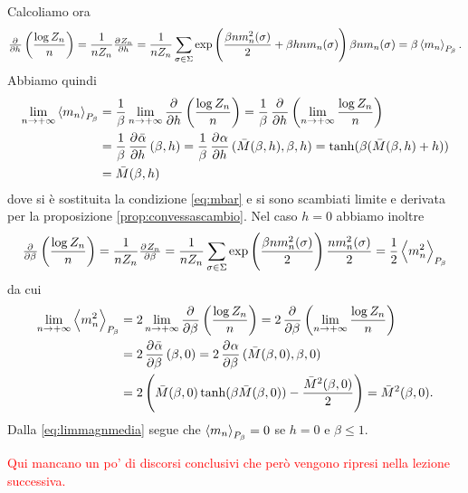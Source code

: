Calcoliamo ora
\[ \pd{}{h}\left(\frac{\log Z_n}{n}\right) = \frac{1}{n Z_n} \pd{Z_n}{h} = \frac{1}{nZ_n}\sum_{\sigma \in \Sigma} \exp\left( \frac{\beta n m_n^2(\sigma)}{2} + \beta h n m_n(\sigma) \right) \beta n m_n(\sigma) = \beta \mean{m_n}_{P_\beta}. \]
Abbiamo quindi
\begin{align}
	\label{eq:limmagnmedia}
    \lim_{n \to +\infty}\mean{m_n}_{P_\beta} & = \frac{1}{\beta} \lim_{n \to +\infty} \dpd{}{h}\left(\frac{\log Z_n}{n}\right) = \frac{1}{\beta} \dpd{}{h} \left( \lim_{n \to +\infty} \frac{\log Z_n}{n} \right) \nonumber \\
	                                         & = \frac{1}{\beta} \dpd{\bar{\alpha}}{h}(\beta, h) = \frac{1}{\beta} \dpd{\alpha}{h} (\bar{M}(\beta,h), \beta, h) = \tanh(\beta(\bar{M}(\beta,h)+h)) \nonumber \\
                                             & = \bar{M}(\beta, h)
\end{align}
dove si è sostituita la condizione \eqref{eq:mbar} e si sono scambiati limite e derivata per la proposizione \ref{prop:convessascambio}. Nel caso $ h = 0 $ abbiamo inoltre
\[ \pd{}{\beta} \left(\frac{\log Z_n}{n}\right) = \frac{1}{n Z_n} \pd{Z_n}{\beta} = \frac{1}{n Z_n} \sum_{\sigma \in \Sigma} \exp\left( \frac{\beta n m_n^2(\sigma)}{2} \right) \frac{n m_n^2(\sigma)}{2} = \frac{1}{2} \mean{m_n^2}_{P_\beta} \]
da cui
\begin{align*}
	\lim_{n \to +\infty}\mean{m_n^2}_{P_\beta} & = 2 \lim_{n \to +\infty} \dpd{}{\beta} \left(\frac{\log Z_n}{n}\right) = 2 \dpd{}{\beta} \left( \lim_{n \to +\infty}\frac{\log Z_n}{n} \right) \\
                                               & =	2 \dpd{\bar{\alpha}}{\beta}(\beta,0) = 2\dpd{\alpha}{\beta}(\bar{M}(\beta,0),\beta,0) \\
                                               & = 2\left( \bar{M}(\beta,0)\tanh(\beta\bar{M}(\beta,0)) - \frac{\bar{M}^2(\beta,0)}{2} \right) = \bar{M}^2(\beta,0).
\end{align*}
Dalla \eqref{eq:limmagnmedia} segue che $ \left< m_n \right>_{P_\beta} = 0 $ se $ h = 0 $ e $ \beta \leq 1 $.

\textcolor{red}{Qui mancano un po' di discorsi conclusivi che però vengono ripresi nella lezione successiva.}

